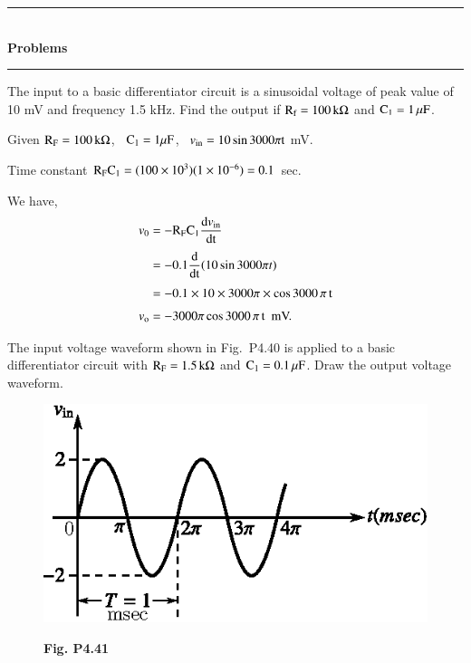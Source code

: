 \begin{center}
\rule{4cm}{1pt}\\
{\bf\Large Problems}\\[-3pt]
\rule{4cm}{1pt}
\end{center}

\begin{problem}\label{prob4.40}
The input to a basic differentiator circuit is a sinusoidal voltage of peak value of 10 mV and frequency 1.5 kHz. Find the output if $\textrm{R}_{\textrm{f}}=100\,\textrm{k}\Omega$ and $\textrm{C}_{1}=1\,\mu\textrm{F}$.
\end{problem}

\begin{solution}
Given $\textrm{R}_{\textrm{F}}=100\,\textrm{k}\Omega$, \ $\textrm{C}_{1}=1\mu\textrm{F}$,  \ $v_{\text{in}}=10\sin 3000 \pi\textrm{t}$ mV.

\medskip
Time constant $\textrm{R}_{\textrm{F}}\textrm{C}_{1}=(100\times 10^{3})(1\times 10^{-6})=0.1$ sec.

\medskip
We have,
\begin{align*}
v_{0} &= -\textrm{R}_{\textrm{F}}\textrm{C}_{1}\dfrac{\textrm{d} v_{\text{in}}}{\operatorname{dt}}\\[3pt]
&= -0.1\dfrac{\textrm{d}}{\operatorname{dt}}(10\sin 3000 \pi t)\\[3pt]
&= -0.1\times 10\times 3000 \pi \times \cos 3000\, \pi\, \textrm{t}\\[3pt]
v_{\textrm{o}} &= -3000\pi \cos 3000\, \pi\,\textrm{t} \text{~ mV.}
\end{align*}
\end{solution}

\eject

\begin{problem}\label{prob4.41}
The input voltage waveform shown in Fig.~P4.40 is applied to a basic differentiator circuit with $\textrm{R}_{\textrm{F}}=1.5\,\textrm{k}\Omega$ and $\textrm{C}_{1}=0.1\,\mu\textrm{F}$. Draw the output voltage waveform.
\begin{figure}[H]
\centering
\includegraphics[scale=.95]{chap4/figP4.40.eps}

\smallskip
{\bf Fig. P4.41}
\end{figure}
\end{problem}

